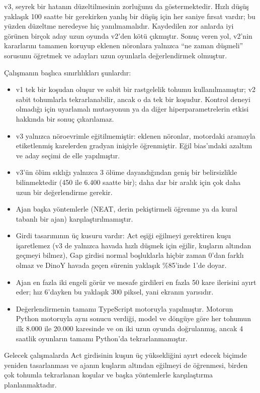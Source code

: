 \documentclass[11pt,a4paper]{article}
\begin{document}
v3, seyrek bir hatanın düzeltilmesinin zorluğunu da göstermektedir. Hızlı düşüş yaklaşık 100 saatte bir gerekirken yanlış bir düşüş için her saniye fırsat vardır; bu yüzden düzeltme neredeyse hiç yanılmamalıdır. Kaydedilen zor anlarda iyi görünen birçok aday uzun oyunda v2'den kötü çıkmıştır. Sonuç veren yol, v2'nin kararlarını tamamen koruyup eklenen nöronlara yalnızca ``ne zaman düşmeli'' sorusunu öğretmek ve adayları uzun oyunlarla değerlendirmek olmuştur.

Çalışmanın başlıca sınırlılıkları şunlardır:
\begin{itemize}
  \item v1 tek bir koşudan oluşur ve sabit bir rastgelelik tohumu kullanılmamıştır; v2 sabit tohumlarla tekrarlanabilir, ancak o da tek bir koşudur. Kontrol deneyi olmadığı için uyarlamalı mutasyonun ya da diğer hiperparametrelerin etkisi hakkında bir sonuç çıkarılamaz.
  \item v3 yalnızca nöroevrimle eğitilmemiştir: eklenen nöronlar, motordaki aramayla etiketlenmiş karelerden gradyan inişiyle öğrenmiştir. Eğil bias'ındaki azaltım ve aday seçimi de elle yapılmıştır.
  \item v3'ün ölüm sıklığı yalnızca 3 ölüme dayandığından geniş bir belirsizlikle bilinmektedir (450 ile 6.400 saatte bir); daha dar bir aralık için çok daha uzun bir değerlendirme gerekir.
  \item Ajan başka yöntemlerle (NEAT, derin pekiştirmeli öğrenme ya da kural tabanlı bir ajan) karşılaştırılmamıştır.
  \item Girdi tasarımının üç kusuru vardır: Act eşiği eğilmeyi gerektiren kuşu işaretlemez (v3 de yalnızca havada hızlı düşmek için eğilir, kuşların altından geçmeyi bilmez), Gap girdisi normal boşluklarla hiçbir zaman 0'dan farklı olmaz ve DinoY havada geçen sürenin yaklaşık \%85'inde 1'de doyar.
  \item Ajan en fazla iki engeli görür ve mesafe girdileri en fazla 50 kare ilerisini ayırt eder; hız 6'dayken bu yaklaşık 300 piksel, yani ekranın yarısıdır.
  \item Değerlendirmenin tamamı TypeScript motoruyla yapılmıştır. Motorun Python motoruyla aynı sonucu verdiği, model ve döngüye göre her tohumun ilk 8.000 ile 20.000 karesinde ve on iki uzun oyunda doğrulanmış, ancak 4 saatlik oyunların tamamı Python'da tekrarlanmamıştır.
\end{itemize}

Gelecek çalışmalarda Act girdisinin kuşun üç yüksekliğini ayırt edecek biçimde yeniden tasarlanması ve ajanın kuşların altından eğilmeyi de öğrenmesi, birden çok tohumla tekrarlanan koşular ve başka yöntemlerle karşılaştırma planlanmaktadır.
\end{document}
